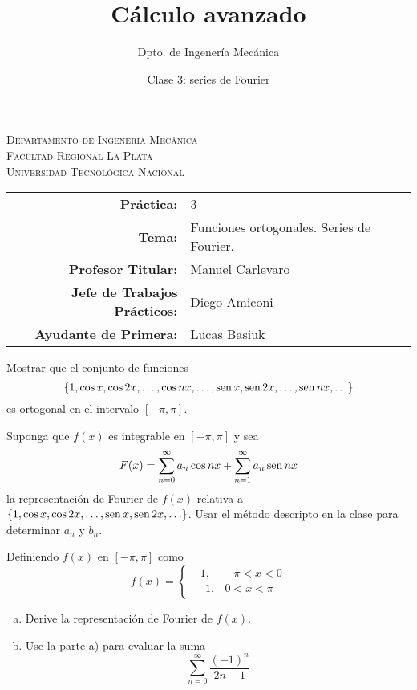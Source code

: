 \documentclass[11pt]{article}
\title{Cálculo avanzado}
\author{Dpto. de Ingenería Mecánica}
\date{Clase 3: series de Fourier}
\begin{document}

\begin{center}
\end{center} 

\begin{center}
\vspace{\baselineskip}
\Large{\textsc{Departamento de Ingenería Mecánica}} \\
\textsc{Facultad Regional La Plata} \\
\textsc{Universidad Tecnológica Nacional}
\end{center}


\begin{center}
\begin{tabular}{r l}
    \textbf{Práctica:} & 3 \\
 \textbf{Tema:} & Funciones ortogonales. Series de Fourier. \\
 \textbf{Profesor Titular:} & Manuel Carlevaro \\
 \textbf{Jefe de Trabajos Prácticos:} & Diego Amiconi \\
 \textbf{Ayudante de Primera:} & Lucas Basiuk 
\end{tabular}\end{center}

\vspace{1em}

\begin{question} %
 Mostrar que el conjunto de funciones
 \[ \{1 , \cos x, \cos 2x, \ldots, \cos nx, \ldots, \operatorname{sen} x, \operatorname{sen} 2x, \ldots, \operatorname{sen} nx, \ldots \} \]
 es ortogonal en el intervalo $[-\pi, \pi]$.
\end{question}

\begin{question} %
Suponga que $f(x)$ es integrable en $[-\pi, \pi]$ y sea
\[ F(x) = \sum_{n = 0}^{\infty} a_n \cos nx + \sum_{n = 1}^{\infty} a_n \operatorname{sen} nx \]
la representación de Fourier de $f(x)$ relativa a $\{1, \cos x, \cos 2x, \ldots, \operatorname{sen} x, \operatorname{sen} 2x, \ldots \}$. Usar el método descripto en la clase para determinar $a_n$ y $b_n$.
\end{question}

\begin{question} %
Definiendo $f(x)$ en $[-\pi, \pi]$ como
\[ f(x) = \begin{cases}
    -1,&  -\pi < x < 0 \\
    \phantom{-}1,&  0 < x < \pi
        \end{cases} \]
\begin{enumerate}[a)]
\item Derive la representación de Fourier de $f(x)$.
\item Use la parte a) para evaluar la suma
    \[ \sum_{n = 0}^{\infty} \frac{(-1)^n}{2 n + 1} \]
\end{enumerate}
\end{question}
\end{document}
